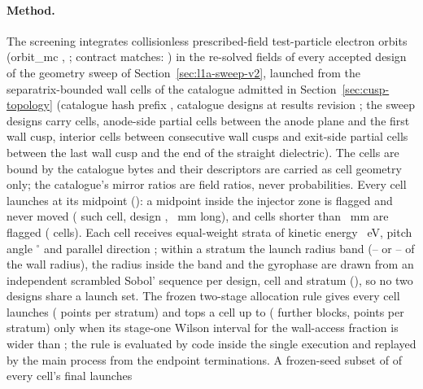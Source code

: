 \paragraph{Method.}
The screening integrates collisionless prescribed-field test-particle electron
orbits (orbit\_mc \WlhOrbitMcVersion, \texttt{\WlhBackend}; contract matches:
\WlhOrbitMcContractMatches) in the re-solved fields of every accepted design of the
geometry sweep of Section~\ref{sec:l1a-sweep-v2}, launched from the separatrix-bounded
wall cells of the catalogue admitted in Section~\ref{sec:cusp-topology}
(catalogue hash prefix \texttt{\WlhCatalogueSha}, \WlhCatalogueDesigns{} catalogue
designs at results revision \texttt{\WlhCatalogueResultCommit}; the
\WlhSweepDesignCount{} sweep designs carry \WlhSweepCellCount{} cells, \WlhAnodeCells{}
anode-side partial cells between the anode plane and the first wall cusp,
\WlhInteriorCells{} interior cells between consecutive wall cusps and \WlhExitCells{}
exit-side partial cells between the last wall cusp and the end of the straight
dielectric). The cells are bound by the catalogue bytes and their descriptors are
carried as cell geometry only; the catalogue's mirror ratios are field ratios, never
probabilities. Every cell launches at its midpoint (\texttt{\WlhLaunchPlaneRule}): a
midpoint inside the injector zone is flagged and never moved
(\WlhInjectorFlaggedCells{} such cell, design \texttt{\WlhInjectorFlaggedDesign},
\WlhInjectorFlaggedLengthMm~mm long), and cells shorter than
\WlhShortCellLengthMm~mm are flagged (\WlhShortCells{} cells). Each cell receives
\WlhStrataPerCell{} equal-weight strata of kinetic energy \WlhEnergies~eV, pitch
angle \WlhPitches$^\circ$ and parallel direction \WlhDirections; within a stratum the
launch radius band (\WlhBandOneLo--\WlhBandOneHi{} or \WlhBandTwoLo--\WlhBandTwoHi{} of
the wall radius), the radius inside the band and the gyrophase are drawn from an
independent scrambled Sobol' sequence per design, cell and stratum
(\WlhSobolGenerator), so no two designs share a launch set. The frozen two-stage
allocation rule gives every cell \WlhStageOnePerCell{} launches
(\WlhStageOnePointsPerStratum{} points per stratum) and tops a cell up to
\WlhFinalPerTopped{} (\WlhStageTwoBlocks{} further blocks, \WlhStageTwoPointsPerStratum{}
points per stratum) only when its stage-one Wilson interval for the wall-access
fraction is wider than \WlhWidthThreshold; the rule is evaluated by code inside the
single execution and replayed by the main process from the endpoint terminations. A
frozen-seed subset of \WlhControlFraction{} of every cell's final launches

